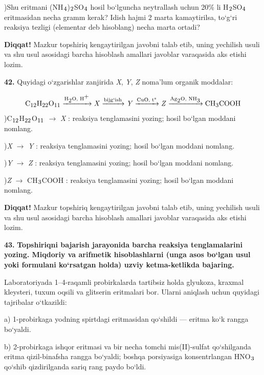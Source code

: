 \documentclass[11pt,a4paper]{article}
\renewcommand{\textsubscript}[1]{\ensuremath{_{\text{\fontsize{8}{8}\selectfont #1}}}}
\renewcommand{\textsuperscript}[1]{\ensuremath{^{\text{\fontsize{8}{8}\selectfont #1}}}}
\newcommand{\diqqat}[1]{\par\smallskip\noindent\textbf{Diqqat!} #1\par\medskip}
\begin{document}
)Shu eritmani (NH\textsubscript{4})\textsubscript{2}SO\textsubscript{4} hosil bo`lguncha neytrallash uchun 20\% li H\textsubscript{2}SO\textsubscript{4} eritmasidan necha gramm kerak? Idish hajmi 2 marta kamaytirilsa, to`g`ri reaksiya tezligi (elementar deb hisoblang) necha marta ortadi?\par
\diqqat{Mazkur topshiriq kengaytirilgan javobni talab etib, uning yechilish usuli va shu usul asosidagi barcha hisoblash amallari javoblar varaqasida aks etishi lozim.}
\noindent\textbf{42.} Quyidagi o`zgarishlar zanjirida \textit{X}, \textit{Y}, \textit{Z} noma'lum organik moddalar:\par
\[\setlength{\fboxsep}{0pt}\text{C\textsubscript{12}H\textsubscript{22}O\textsubscript{11}}\xrightarrow{\text{H\textsubscript{2}O, H\textsuperscript{+}}}\text{\textit{X}}\xrightarrow{\text{bijg`ish}}\text{\textit{Y}}\xrightarrow{\text{CuO, t\textdegree{}}}\text{\textit{Z}}\xrightarrow{\text{Ag\textsubscript{2}O, NH\textsubscript{3}}}\text{CH\textsubscript{3}COOH}\]
)C\textsubscript{12}H\textsubscript{22}O\textsubscript{11} $\to$ \textit{X} : reaksiya tenglamasini yozing; hosil bo`lgan moddani nomlang.\par
{})\textit{X} $\to$ \textit{Y} : reaksiya tenglamasini yozing; hosil bo`lgan moddani nomlang.\par
{})\textit{Y} $\to$ \textit{Z} : reaksiya tenglamasini yozing; hosil bo`lgan moddani nomlang.\par
{})\textit{Z} $\to$ CH\textsubscript{3}COOH : reaksiya tenglamasini yozing; hosil bo`lgan moddani nomlang.\par
\diqqat{Mazkur topshiriq kengaytirilgan javobni talab etib, uning yechilish usuli va shu usul asosidagi barcha hisoblash amallari javoblar varaqasida aks etishi lozim.}
\noindent\textbf{43.} \textbf{Topshiriqni bajarish jarayonida barcha reaksiya tenglamalarini yozing. Miqdoriy va arifmetik hisoblashlarni (unga asos bo`lgan usul yoki formulani ko`rsatgan holda) uzviy ketma-ketlikda bajaring.}\par\smallskip
Laboratoriyada 1--4-raqamli probirkalarda tartibsiz holda glyukoza, kraxmal kleysteri, tuxum oqsili va glitserin eritmalari bor. Ularni aniqlash uchun quyidagi tajribalar o`tkazildi:\par
a) 1-probirkaga yodning spirtdagi eritmasidan qo`shildi --- eritma ko`k rangga bo`yaldi.\par
b) 2-probirkaga ishqor eritmasi va bir necha tomchi mis(II)-sulfat qo`shilganda eritma qizil-binafsha rangga bo`yaldi; boshqa porsiyasiga konsentrlangan HNO\textsubscript{3} qo`shib qizdirilganda sariq rang paydo bo`ldi.\par
\end{document}

